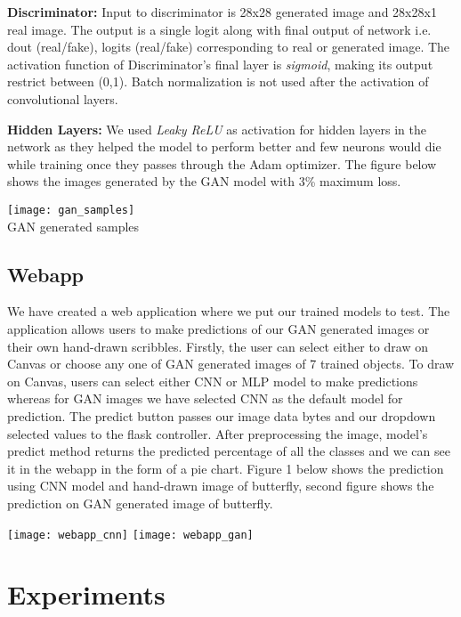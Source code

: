 \documentclass{article} %
\begin{document}
\textbf{Discriminator:} Input to discriminator is 28x28 generated image and 28x28x1 real image. The output is a single logit along with final output of network i.e. {d\textunderscore out (real/fake), logits (real/fake)} corresponding to real or generated image. The activation function of Discriminator's final layer is \textit{sigmoid}, making its output restrict between (0,1). Batch normalization is not used after the activation of convolutional layers.
 
\textbf{Hidden Layers:} We used \textit{Leaky ReLU} as activation for hidden layers in the network as they helped the model to perform better and few neurons would die while training once they passes through the Adam optimizer.
The figure below shows the images generated by the GAN model with 3\% maximum loss.
\begin{center}
\texttt{[image: gan\_samples]}\\
\caption{GAN generated samples}
\end{center}
\subsection{Webapp}
We have created a web application where we put our trained models to test. The application allows users to make predictions of our GAN generated images or their own hand-drawn scribbles. Firstly, the user can select either to draw on Canvas or choose any one of GAN generated images of 7 trained objects. To draw on Canvas, users can select either CNN or MLP model to make predictions whereas for GAN images we have selected CNN as the default model for prediction.
The predict button passes our image data bytes and our dropdown selected values to the flask controller. After preprocessing the image, model's predict method returns the predicted percentage of all the classes and we can see it in the webapp in the form of a pie chart. Figure 1 below shows the prediction using CNN model and hand-drawn image of butterfly, second figure shows the prediction on GAN generated image of butterfly.

\texttt{[image: webapp\_cnn]}
\texttt{[image: webapp\_gan]}

%
%



\section{Experiments}
\label{experiments}
\end{document}
